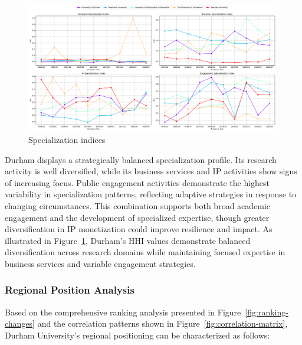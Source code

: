 \documentclass[journal,onecolumn, 10pt,draftclsnofoot]{IEEEtran}
\begin{document}
\begin{figure}[h]
\centering
\includegraphics[width=0.99\textwidth]{Fig/figure37.specialization_indices.png}
\caption{Specialization indices}
\label{fig:specialization-indices}
\end{figure}

Durham displays a strategically balanced specialization profile. Its research activity is well diversified, while its business services and IP activities show signs of increasing focus. Public engagement activities demonstrate the highest variability in specialization patterns, reflecting adaptive strategies in response to changing circumstances. This combination supports both broad academic engagement and the development of specialized expertise, though greater diversification in IP monetization could improve resilience and impact. As illustrated in Figure~\ref{fig:specialization-indices}, Durham's HHI values demonstrate balanced diversification across research domains while maintaining focused expertise in business services and variable engagement strategies.

\subsubsection{Regional Position Analysis}

Based on the comprehensive ranking analysis presented in Figure~\ref{fig:ranking-changes} and the correlation patterns shown in Figure~\ref{fig:correlation-matrix}, Durham University's regional positioning can be characterized as follows:
\end{document}
